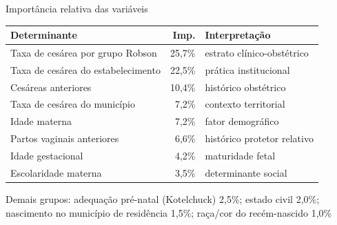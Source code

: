 \documentclass[aspectratio=169,xcolor=table]{beamer}
\begin{document}
\begin{frame}{Importância relativa das variáveis}
    \small
    \begin{table}
        \centering
        \begin{tabular}{lrp{5.5cm}}
            \toprule
            Determinante & Imp. & Interpretação \\
            \midrule
            Taxa de cesárea por grupo Robson & 25{,}7\% & estrato clínico-obstétrico \\
            Taxa de cesárea do estabelecimento & 22{,}5\% & prática institucional \\
            Cesáreas anteriores & 10{,}4\% & histórico obstétrico \\
            Taxa de cesárea do município & 7{,}2\% & contexto territorial \\
            Idade materna & 7{,}2\% & fator demográfico \\
            Partos vaginais anteriores & 6{,}6\% & histórico protetor relativo \\
            Idade gestacional & 4{,}2\% & maturidade fetal \\
            Escolaridade materna & 3{,}5\% & determinante social \\
            \bottomrule
        \end{tabular}
    \end{table}

    \vspace{0.3em}
    {\scriptsize Demais grupos: adequação pré-natal (Kotelchuck) 2{,}5\%; estado civil 2{,}0\%; nascimento no município de residência 1{,}5\%; raça/cor do recém-nascido 1{,}0\%}
\end{frame}
\end{document}
